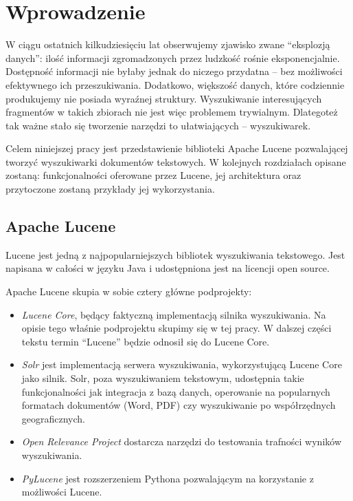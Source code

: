 \chapter{Wprowadzenie}

W ciągu ostatnich kilkudziesięciu lat obserwujemy zjawisko zwane ``eksplozją danych'': ilość informacji zgromadzonych przez ludzkość rośnie eksponencjalnie. Dostępność informacji nie byłaby jednak do niczego przydatna -- bez możliwości efektywnego ich przeszukiwania. Dodatkowo, większość danych, które codziennie produkujemy nie posiada wyraźnej struktury.  Wyszukiwanie interesujących fragmentów w takich zbiorach nie jest więc problemem trywialnym. Dlategoteż tak ważne stało się tworzenie narzędzi to ułatwiających -- wyszukiwarek. 

Celem niniejszej pracy jest przedstawienie biblioteki Apache Lucene pozwalającej tworzyć wyszukiwarki dokumentów tekstowych. W kolejnych rozdziałach opisane zostaną: funkcjonalności oferowane przez Lucene, jej architektura oraz przytoczone zostaną przykłady jej wykorzystania.

\section{Apache Lucene}

Lucene jest jedną z najpopularniejszych bibliotek wyszukiwania tekstowego. Jest napisana w całości w języku Java i udostępniona jest na licencji open source.

Apache Lucene skupia w sobie cztery główne podprojekty: 
\begin{itemize}
 \item \emph{Lucene Core}, będący faktyczną implementacją silnika wyszukiwania. Na opisie tego właśnie podprojektu skupimy się w tej pracy. W dalszej części tekstu termin ``Lucene'' będzie odnosił się do Lucene Core.
 \item \emph{Solr} jest implementacją serwera wyszukiwania, wykorzystującą Lucene Core jako silnik. Solr, poza wyszukiwaniem tekstowym, udostępnia takie funkcjonalności jak integracja z bazą danych, operowanie na popularnych formatach dokumentów (Word, PDF) czy wyszukiwanie po współrzędnych geograficznych.
 \item \emph{Open Relevance Project} dostarcza narzędzi do testowania trafności wyników wyszukiwania.
 \item \emph{PyLucene} jest rozszerzeniem Pythona pozwalającym na korzystanie z możliwości Lucene.
\end{itemize}


